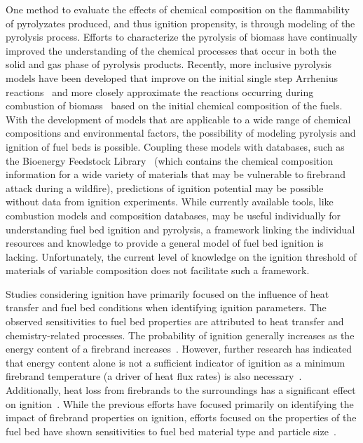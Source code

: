     One method to evaluate the effects of chemical composition on the flammability of pyrolyzates produced, and thus ignition propensity, is through modeling of the pyrolysis process. Efforts to characterize the pyrolysis of biomass have continually improved the understanding of the chemical processes that occur in both the solid and gas phase of pyrolysis products. Recently, more inclusive pyrolysis models have been developed that improve on the initial single step Arrhenius reactions~\cite{DIBLASI199371} and more closely approximate the reactions occurring during combustion of biomass~\cite{Ranzi2008, Debiagi2015, Dhahak2019} based on the initial chemical composition of the fuels. With the development of models that are applicable to a wide range of chemical compositions and environmental factors, the possibility of modeling pyrolysis and ignition of fuel beds is possible. Coupling these models with databases, such as the Bioenergy Feedstock Library~\cite{feedstock} (which contains the chemical composition information for a wide variety of materials that may be vulnerable to firebrand attack during a wildfire), predictions of ignition potential may be possible without data from ignition experiments. While currently available tools, like combustion models and composition databases, may be useful individually for understanding fuel bed ignition and pyrolysis, a framework linking the individual resources and knowledge to provide a general model of fuel bed ignition is lacking. Unfortunately, the current level of knowledge on the ignition threshold of materials of variable composition does not facilitate such a framework.
    
  Studies considering ignition have primarily focused on the influence of heat transfer and fuel bed conditions when identifying ignition parameters. The observed sensitivities to fuel bed properties are attributed to heat transfer and chemistry-related processes. The probability of ignition generally increases as the energy content of a firebrand increases~\cite{Hadden2011}. However, further research has indicated that energy content alone is not a sufficient indicator of ignition as a minimum firebrand temperature (a driver of heat flux rates) is also necessary~\cite{Zak2014}. Additionally, heat loss from firebrands to the surroundings has a significant effect on ignition~\cite{Fernandez-Pello2015}. While the previous efforts have focused primarily on identifying the impact of firebrand properties on ignition, efforts focused on the properties of the fuel bed have shown sensitivities to fuel bed material type and particle size~\cite{Urban2018}. 

